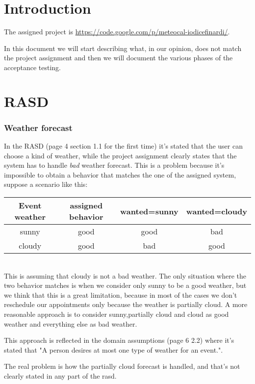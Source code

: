 \documentclass[10pt,a4paper,titlepage]{article}
\begin{document}


\tableofcontents

\pagebreak
\part{Introduction}
The assigned project is \url{https://code.google.com/p/meteocal-iodicefinardi/}.

In this document we will start describing what, in our opinion, does not match the project assignment and then we will document the various phases of the acceptance testing.

\pagebreak
\part{RASD}
\section{Weather forecast}
In the RASD (page 4 section 1.1 for the first time) it's stated that the user can choose a kind of weather, while the project assignment clearly states that the system has to handle \emph{bad} weather forecast. This is a problem because it's impossible to obtain a behavior that matches the one of the assigned system, suppose a scenario like this:\\
\begin{tabular}{|c|c|c|c|}
\hline 
Event weather & assigned behavior & wanted=sunny & wanted=cloudy \\ 
\hline 
sunny & good & good & bad \\ 
\hline 
cloudy & good & bad & good \\ 
\hline 
\end{tabular}\\
This is assuming that cloudy is not a bad weather. The only situation where the two behavior matches is when we consider only sunny to be a good weather, but we think that this is a great limitation, because in most of the cases we don't reschedule our appointments only because the weather is partially cloud. A more reasonable approach is to consider sunny,partially cloud and cloud as good weather and everything else as bad weather. 

This approach is reflected in the domain assumptions (page 6 2.2) where it's stated that "A person desires at most one type of weather for an event.". 

The real problem is how the partially cloud forecast is handled, and that's not clearly stated in any part of the rasd.
\end{document}
